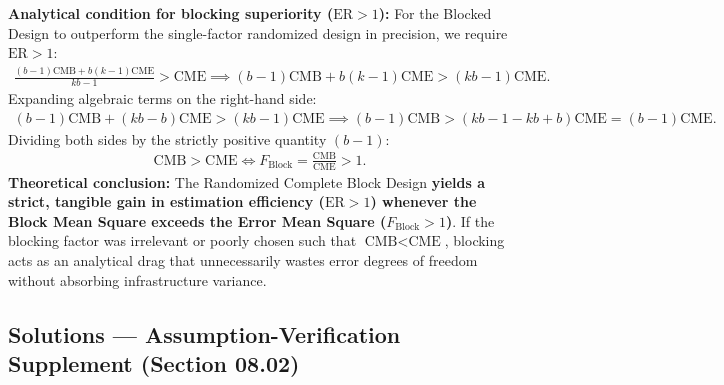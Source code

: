 \begin{solproblema}
\begin{enumerate}
		\textbf{Analytical condition for blocking superiority ($\text{ER} > 1$):}
		For the Blocked Design to outperform the single-factor randomized design in precision, we require $\text{ER} > 1$:
		\begin{align}
			\frac{(b-1)\text{CMB} + b(k-1)\text{CME}}{kb - 1} > \text{CME} \implies (b-1)\text{CMB} + b(k-1)\text{CME} > (kb - 1)\text{CME}.
		\end{align}
		Expanding algebraic terms on the right-hand side:
		\begin{align}
			(b-1)\text{CMB} + (kb - b)\text{CME} > (kb - 1)\text{CME} \implies (b-1)\text{CMB} > (kb - 1 - kb + b)\text{CME} = (b-1)\text{CME}.
		\end{align}
		Dividing both sides by the strictly positive quantity $(b-1)$:
		\begin{align}
			\text{CMB} > \text{CME} \iff F_{\text{Block}} = \frac{\text{CMB}}{\text{CME}} > 1.
		\end{align}
		\textbf{Theoretical conclusion:} The Randomized Complete Block Design \textbf{yields a strict, tangible gain in estimation efficiency ($\text{ER} > 1$) whenever the Block Mean Square exceeds the Error Mean Square ($F_{\text{Block}} > 1$)}. If the blocking factor was irrelevant or poorly chosen such that $\text{CMB} < \text{CME}$, blocking acts as an analytical drag that unnecessarily wastes error degrees of freedom without absorbing infrastructure variance.
	\end{enumerate}
\end{solproblema}

\subsection{Solutions --- Assumption-Verification Supplement (Section 08.02)}

